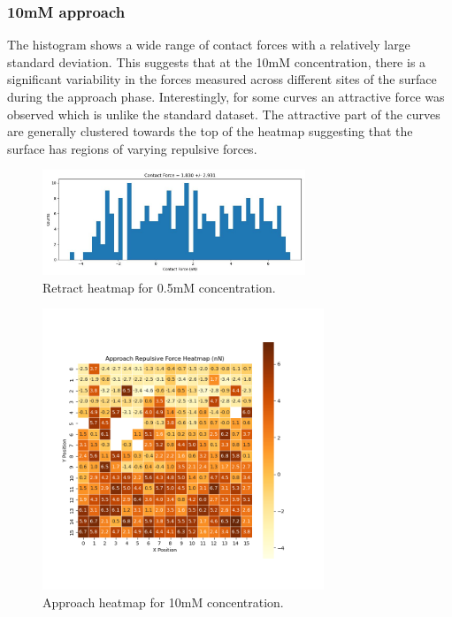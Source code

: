 


\newpage
\subsubsection{10mM approach}

The histogram shows a wide range of contact forces with a relatively large standard deviation. This suggests that at the 10mM concentration, there is a significant variability in the forces measured across different sites of the surface during the approach phase. Interestingly, for some curves an attractive force was observed which is unlike the standard dataset. The attractive part of the curves are generally clustered towards the top of the heatmap suggesting that the surface has regions of varying repulsive forces. 

\begin{figure}[h!!!]
    \centering
    \includegraphics[width=0.7\textwidth]{chapter7/ForceMaps/10mM/approach_f_c_hist.jpg}
    \caption{Retract heatmap for 0.5mM concentration.}
    \label{fig:appro_fc_10mM}
\end{figure}

\begin{figure}[h!!!!!]
    \centering
    \includegraphics[width=0.75\textwidth]{chapter7/ForceMaps/10mM/Approach heatmap.png}
    \caption{Approach heatmap for 10mM concentration.}
    \label{fig:approach_heatmap_10mM}
\end{figure}


